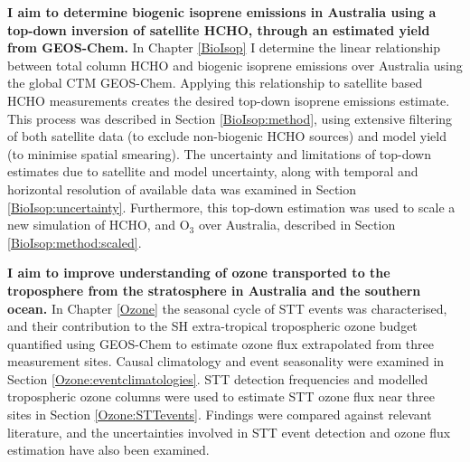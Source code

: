   \textbf{I aim to determine biogenic isoprene emissions in Australia using a top-down inversion of satellite HCHO, through an estimated yield from GEOS-Chem.}
  In Chapter \ref{BioIsop} I determine the linear relationship between total column HCHO and biogenic isoprene emissions over Australia using the global CTM GEOS-Chem.
  Applying this relationship to satellite based HCHO measurements creates the desired top-down isoprene emissions estimate.
  This process was described in Section \ref{BioIsop:method}, using extensive filtering of both satellite data (to exclude non-biogenic HCHO sources) and model yield (to minimise spatial smearing).
  The uncertainty and limitations of top-down estimates due to satellite and model uncertainty, along with temporal and horizontal resolution of available data was examined in Section \ref{BioIsop:uncertainty}.
  Furthermore, this top-down estimation was used to scale a new simulation of HCHO, and O$_3$ over Australia, described in Section \ref{BioIsop:method:scaled}.
   
  \textbf{I aim to improve understanding of ozone transported to the troposphere from the stratosphere in Australia and the southern ocean.}
  In Chapter \ref{Ozone} the seasonal cycle of STT events was characterised, and their contribution to the SH extra-tropical tropospheric ozone budget quantified using GEOS-Chem to estimate ozone flux extrapolated from three measurement sites.
  Causal climatology and event seasonality were examined in Section \ref{Ozone:eventclimatologies}.
  STT detection frequencies and modelled tropospheric ozone columns were used to estimate STT ozone flux near three sites in Section \ref{Ozone:STTevents}. 
  Findings were compared against relevant literature, and %
  the uncertainties involved in STT event detection and ozone flux estimation have also been examined.
  
